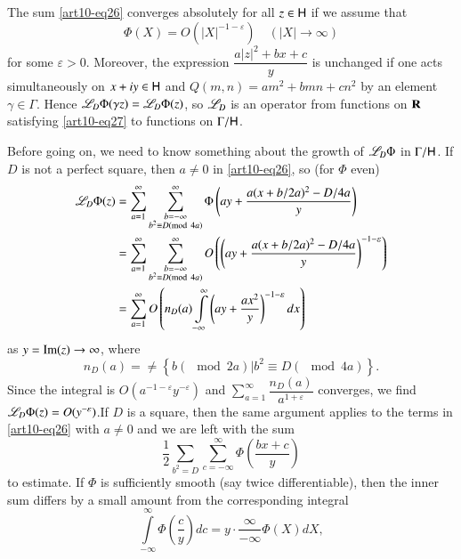 The sum \eqref{art10-eq26} converges absolutely for all $z \in \mathsf{H}$ if we assume that 
\begin{equation*}
\Phi (X) = O(|X|^{-1-\varepsilon}) \quad (|X| \to \infty) \tag{27}\label{art10-eq27}
\end{equation*}
for some $\varepsilon > 0$. Moreover, the expression $\dfrac{a|z|^2 + bx +c}{y}$ is unchanged if one acts simultaneously on $x + iy \in \mathsf{H}$ and $Q(m,n) = am^2 + bmn + cn^2$ by an element $\gamma \in \Gamma$. Hence $\mathscr{L}_D \Phi (\gamma z) = \mathscr{L}_D \Phi (z)$, so $\mathscr{L}_D$ is an operator from functions on $\mathbf{R}$ satisfying \eqref{art10-eq27} to functions on $\Gamma / \mathsf{H}$.

Before going on, we need to know something about the growth of $\mathscr{L}_D\Phi$ in $\Gamma / \mathsf{H}$. If $D$ is not a perfect square, then $a \neq 0$ in \eqref{art10-eq26}, so (for $\Phi$ even)
\begin{align*}
\mathscr{L}_D \Phi (z)  & = \sum\limits^\infty_{a=1} \sum\limits^\infty_{\substack{b = -\infty\\ b^2 \equiv D ({\rm{mod}}\kern.3em 4a)}} \Phi \left(ay + \frac{a(x+ b/ 2 a)^2 - D / 4a}{y} \right)\\
& = \sum\limits^\infty_{a=1} \sum\limits^\infty_{\substack{b = - \infty\\ b^2 \equiv D ({\rm{mod}}\kern.3em 4a)}} O \left(\left(ay+ \frac{a(x + b / 2 a)^2 - D / 4a}{y} \right)^{-1-\varepsilon}\right)\\
& = \sum\limits^\infty_{a=1} O \left(n_D (a) \int\limits^\infty_{-\infty} \left(ay + \frac{ax^2}{y} \right)^{-1-\varepsilon} dx\right)
\end{align*}
as $y = \operatorname{Im} (z) \to \infty$, where 
\begin{equation*}
n_D (a) = \neq \left\{\left. b (\mod 2 a) \right| b^2 \equiv D (\mod 4 a) \right\}. \tag{28} \label{art10-eq28}
\end{equation*}
Since the integral is $O(a^{-1-\varepsilon} y^{-\varepsilon})$ and $\sum\limits^\infty_{a=1} \dfrac{n_D (a)}{a^{1+\varepsilon}}$ converges, we find $\mathscr{L}_D \Phi (z) = O (y^{-\varepsilon})$.\pageoriginale If $D$ is a square, then the same argument applies to the terms in \eqref{art10-eq26} with 
$a \neq 0$ and we are left with the sum 
$$
\frac{1}{2} \sum\limits_{b^2 =D} \sum\limits^\infty_{c = - \infty} \Phi (\frac{bx+c}{y})
$$
to estimate. If $\Phi$ is sufficiently smooth (say twice differentiable), then the inner sum differs by a small amount from the corresponding integral 
$$
\int\limits^\infty_{-\infty} \Phi (\frac{c}{y}) dc = y \cdot \frac{\infty}{-\infty} \Phi (X) d X,
$$
